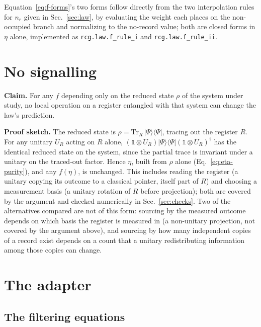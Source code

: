\documentclass[aps,pra,reprint,amsmath,amssymb,superscriptaddress]{revtex4-2}
\begin{document}
Equation~\eqref{eq:f-forms}'s two forms follow directly from the two
interpolation rules for $n_r$ given in Sec.~\ref{sec:law}, by evaluating the
weight each places on the non-occupied branch and normalizing to the
no-record value; both are closed forms in $\eta$ alone, implemented as
\texttt{rcg.law.f\_rule\_i} and \texttt{rcg.law.f\_rule\_ii}.

\section{No signalling}
\label{app:nosignal}

\textbf{Claim.} For any $f$ depending only on the reduced state $\rho$ of the
system under study, no local operation on a register entangled with that
system can change the law's prediction.

\textbf{Proof sketch.} The reduced state is $\rho=\mathrm{Tr}_R\,\lvert
\Psi\rangle\langle\Psi\rvert$, tracing out the register $R$. For any unitary
$U_R$ acting on $R$ alone, $(\mathbb{1}\otimes U_R)\lvert\Psi\rangle\langle
\Psi\rvert(\mathbb{1}\otimes U_R)^\dagger$ has the identical reduced state on
the system, since the partial trace is invariant under a unitary on the
traced-out factor. Hence $\eta$, built from $\rho$ alone
(Eq.~\eqref{eq:eta-purity}), and any $f(\eta)$, is unchanged. This includes
reading the register (a unitary copying its outcome to a classical
pointer, itself part of $R$) and choosing a measurement basis (a unitary
rotation of $R$ before projection); both are covered by the argument and
checked numerically in Sec.~\ref{sec:checks}. Two of the alternatives
compared are not of this form: sourcing by the measured outcome depends on which
basis the register is measured in (a non-unitary projection, not covered by
the argument above), and sourcing by how many independent copies of a record
exist depends on a count that a unitary redistributing information among
those copies can change.

\section{The adapter}
\label{app:adapter}

\subsection{The filtering equations}
\end{document}
